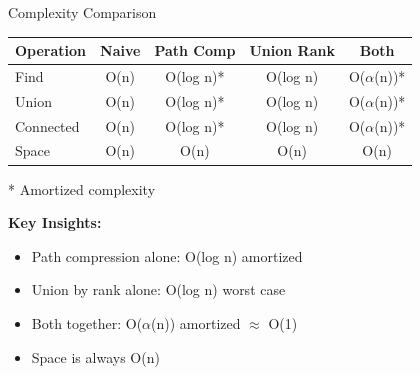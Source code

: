 \documentclass[aspectratio=169]{beamer}
\begin{document}
\begin{frame}{Complexity Comparison}
  \begin{table}
    \centering
    \begin{tabular}{|l|c|c|c|c|}
      \hline
      \textbf{Operation} & \textbf{Naive} & \textbf{Path Comp} & \textbf{Union Rank} & \textbf{Both} \\
      \hline
      Find & O(n) & O(log n)* & O(log n) & O($\alpha$(n))* \\
      \hline
      Union & O(n) & O(log n)* & O(log n) & O($\alpha$(n))* \\
      \hline
      Connected & O(n) & O(log n)* & O(log n) & O($\alpha$(n))* \\
      \hline
      Space & O(n) & O(n) & O(n) & O(n) \\
      \hline
    \end{tabular}
  \end{table}

  \vspace{0.3cm}
  * Amortized complexity

  \vspace{0.5cm}
  \textbf{Key Insights:}
  \begin{itemize}
    \item Path compression alone: O(log n) amortized
    \item Union by rank alone: O(log n) worst case
    \item Both together: O($\alpha$(n)) amortized $\approx$ O(1)
    \item Space is always O(n)
  \end{itemize}
\end{frame}
\end{document}
